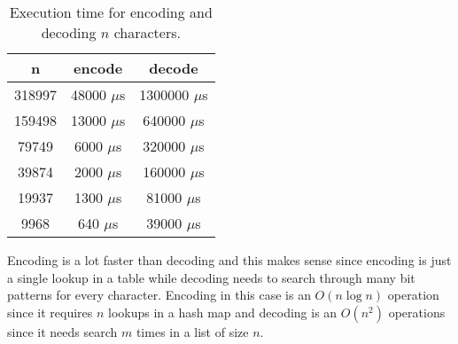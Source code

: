\documentclass[a4paper,11pt]{article}
\begin{document}
\begin{table}[H]
\centering
\begin{tabular}{|c|c|c|}
\hline
\textbf{n} & \textbf{encode} & \textbf{decode} \\
\hline
  318997 & 48000 $\mu$s & 1300000 $\mu$s \\
  159498 & 13000 $\mu$s & 640000 $\mu$s \\
  79749 & 6000 $\mu$s & 320000 $\mu$s \\
  39874 & 2000 $\mu$s & 160000 $\mu$s \\
  19937 & 1300 $\mu$s & 81000 $\mu$s \\
  9968 & 640 $\mu$s & 39000 $\mu$s \\
\hline
\end{tabular}
\caption{Execution time for encoding and decoding $n$ characters.}
\label{tab:table1}
\end{table}

Encoding is a lot faster than decoding and this makes sense since encoding is just a single lookup in a table while decoding needs to search through many bit patterns for every character.
Encoding in this case is an $O(n \log n)$ operation since it requires $n$ lookups in a hash map and decoding is an $O(n^2)$ operations since it needs search $m$ times in a list of size $n$.
\end{document}
